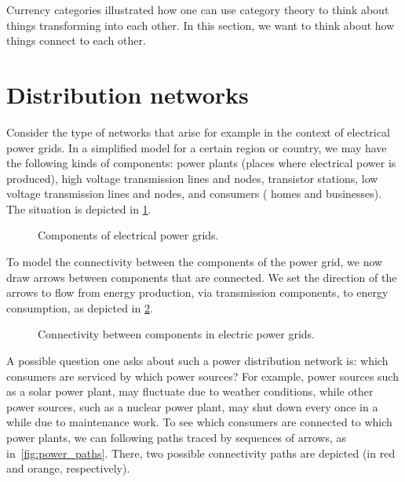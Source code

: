 
Currency categories illustrated how one can use category theory to think about things transforming into each other. In this section, we want to think about how things connect to each other.


\section{}


\section{Distribution networks}

Consider the type of networks that arise for example in the context of electrical power grids. In a simplified model for a certain region or country, we may have the following kinds of components: power plants (places where electrical power is produced), high voltage transmission lines and nodes, transistor stations, low voltage transmission lines and nodes, and consumers ( homes and businesses). The situation is depicted in \cref{fig:power_nodes}.

\begin{figure}[h!]
    \centering
    \caption{Components of electrical power grids.}
    \label{fig:power_nodes}
\end{figure}
To model the connectivity between the components of the power grid, we now draw arrows between components that are connected. We set the direction of the arrows to flow from energy production, via transmission components, to energy consumption, as depicted in \cref{fig:power_nodes_connected}.
\begin{figure}[h!]
    \centering
    \caption{Connectivity between components in electric power grids.}
    \label{fig:power_nodes_connected}
\end{figure}

A possible question one asks about such a power distribution network is: which consumers are serviced by which power sources? For example, power sources such as a solar power plant, may fluctuate due to weather conditions, while other power sources, such as a nuclear power plant, may shut down every once in a while due to maintenance work. To see which consumers are connected to which power plants, we can following paths traced by sequences of arrows, as in~\cref{fig:power_paths}. There, two possible connectivity paths are depicted (in red and orange, respectively).


